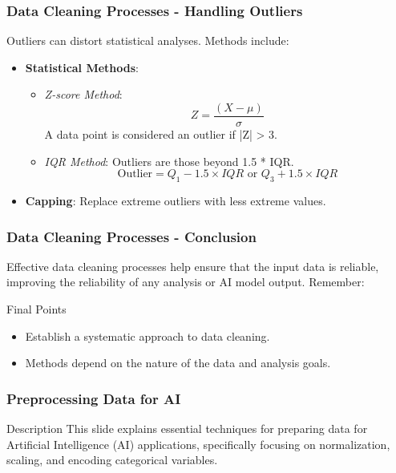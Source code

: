 \documentclass[aspectratio=169]{beamer}
\begin{document}
\begin{frame}[fragile]
  \frametitle{Data Cleaning Processes - Handling Outliers}
  Outliers can distort statistical analyses. Methods include:
  
  \begin{itemize}
    \item \textbf{Statistical Methods}:
    \begin{itemize}
      \item \textit{Z-score Method}:
      \begin{equation}
        Z = \frac{(X - \mu)}{\sigma}
      \end{equation}
      A data point is considered an outlier if |Z| > 3.
      
      \item \textit{IQR Method}: Outliers are those beyond 1.5 * IQR.
      \begin{equation}
        \text{Outlier} = Q_1 - 1.5 \times IQR \text{ or } Q_3 + 1.5 \times IQR
      \end{equation}
    \end{itemize}
    \item \textbf{Capping}: Replace extreme outliers with less extreme values.
  \end{itemize}
\end{frame}

\begin{frame}[fragile]
  \frametitle{Data Cleaning Processes - Conclusion}
  Effective data cleaning processes help ensure that the input data is reliable, improving the reliability of any analysis or AI model output. Remember:
  
  \begin{block}{Final Points}
    \begin{itemize}
      \item Establish a systematic approach to data cleaning.
      \item Methods depend on the nature of the data and analysis goals.
    \end{itemize}
  \end{block}
\end{frame}

\begin{frame}
    \frametitle{Preprocessing Data for AI}
    \begin{block}{Description}
        This slide explains essential techniques for preparing data for Artificial Intelligence (AI) applications, specifically focusing on normalization, scaling, and encoding categorical variables.
    \end{block}
\end{frame}
\end{document}
